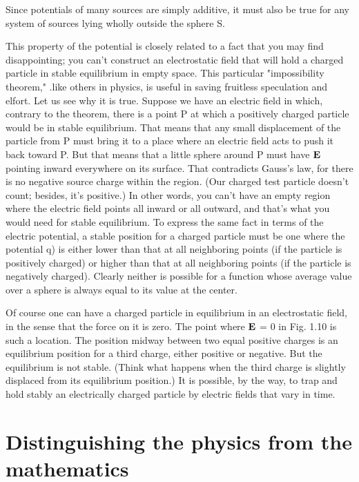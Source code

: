 Since potentials of many sources are simply additive, it must also be
true for any system of sources lying wholly outside the sphere S.

This property of the potential is closely related to a fact that you
may find disappointing; you can't construct an electrostatic field that
will hold a charged particle in stable equilibrium in empty space.
This particular "impossibility theorem," .like others in physics, is
useful in saving fruitless speculation and elfort. Let us see why it
is true. Suppose we have an electric field in which, contrary to the
theorem, there is a point P at which a positively charged particle
would be in stable equilibrium. That means that any small displacement
of the particle from P must bring it to a place where an electric
field acts to push it back toward P. But that means that a little sphere
around P must have $\mathbf{E}$ pointing inward everywhere on its surface.
That contradicts Gauss's law, for there is no negative source charge
within the region. (Our charged test particle doesn't count; besides,
it's positive.) In other words, you can't have an empty region where
the electric field points all inward or all outward, and that's what you
would need for stable equilibrium. To express the same fact in terms
of the electric potential, a stable position for a charged particle must
be one where the potential q) is either lower than that at all neighboring
points (if the particle is positively charged) or higher than that
at all neighboring points (if the particle is negatively charged).
Clearly neither is possible for a function whose average value over a
sphere is always equal to its value at the center.

Of course one can have a charged particle in equilibrium in an electrostatic
field, in the sense that the force on it is zero. The point
where $\mathbf{E}$ = 0 in Fig. 1.10 is such a location. The position midway
between two equal positive charges is an equilibrium position for a
third charge, either positive or negative. But the equilibrium is not
stable. (Think what happens when the third charge is slightly displaced
from its equilibrium position.) It is possible, by the way,
to trap and hold stably an electrically charged particle by electric
fields that vary in time.

\section{Distinguishing the physics from the mathematics}

